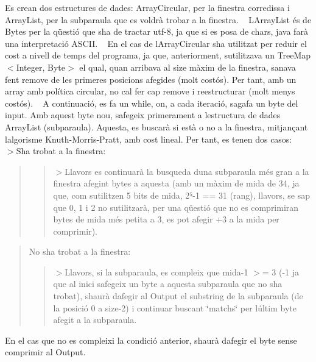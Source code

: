 Es crean dos estructures de dades\+: Array\+Circular, per la finestra corredissa i Array\+List, per la subparaula que es voldrà trobar a la finestra. ~\newline
 L\textquotesingle{}Array\+List és de Bytes per la qüestió que s\textquotesingle{}ha de tractar utf-\/8, ja que si es posa de char\textquotesingle{}s, java farà una interpretació A\+S\+C\+II. ~\newline
 En el cas de l\textquotesingle{}Array\+Circular s\textquotesingle{}ha utilitzat per reduir el cost a nivell de temps del programa, ja que, anteriorment, s\textquotesingle{}utilitzava un Tree\+Map$<$Integer, Byte$>$ el qual, quan arribava al size màxim de la finestra, s\textquotesingle{}anava fent remove de les primeres posicions afegides (molt costós). Per tant, amb un array amb política circular, no cal fer cap remove i reestructurar (molt menys costós). ~\newline
 A continuació, es fa un while, on, a cada iteració, s\textquotesingle{}agafa un byte del input. Amb aquest byte nou, s\textquotesingle{}afegeix primerament a l\textquotesingle{}estructura de dades Array\+List (subparaula). Aquesta, es buscarà si està o no a la finestra, mitjançant l\textquotesingle{}algorisme Knuth-\/\+Morris-\/\+Pratt, amb cost lineal. Per tant, es tenen dos casos\+: ~\newline
 $>$S\textquotesingle{}ha trobat a la finestra\+: ~\newline
 \begin{quote}


\begin{quote}
$>$Llavors es continuarà la busqueda d\textquotesingle{}una subparaula més gran a la finestra afegint bytes a aquesta (amb un màxim de mida de 34, ja que, com s\textquotesingle{}utilitzen 5 bits de mida, 2⁵-\/1 == 31 (rang), llavors, se sap que 0, 1 i 2 no s\textquotesingle{}utilitzarà, per una qüestió que no es comprimiran bytes de mida més petita a 3, es pot afegir +3 a la mida per comprimir). ~\newline
 \end{quote}
\end{quote}


\begin{quote}
No s\textquotesingle{}ha trobat a la finestra\+: ~\newline
 \begin{quote}
$>$Llavors, si la subparaula, es compleix que mida-\/1 $>$= 3 (-\/1 ja que al inici s\textquotesingle{}afegeix un byte a aquesta subparaula que no s\textquotesingle{}ha trobat), s\textquotesingle{}haurà d\textquotesingle{}afegir al Output el substring de la subparaula (de la posició 0 a size-\/2) i continuar buscant \char`\"{}match\textquotesingle{}s\char`\"{} per l\textquotesingle{}últim byte afegit a la subparaula.~\newline
 \end{quote}
\end{quote}
En el cas que no es compleixi la condició anterior, s\textquotesingle{}haurà d\textquotesingle{}afegir el byte sense comprimir al Output.

